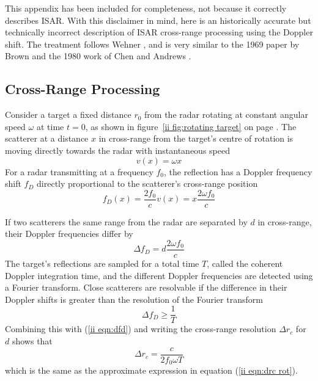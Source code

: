 This appendix has been included for completeness, not because it correctly
describes ISAR.  With this disclaimer in mind, here is an historically 
accurate but technically incorrect description of ISAR cross-range processing
using the Doppler shift.  The treatment follows Wehner \cite{Weh87}, and is
very similar to the 1969 paper by Brown \cite{Bro69} and the 1980 work of
Chen and Andrews \cite{Che80a}.

\subsection{Cross-Range Processing}

Consider a target a fixed distance $r_0$ from the radar rotating at constant
angular speed $\omega$ at time $t=0$, as shown in figure~\ref{ii fig:rotating target} 
on page \pageref{ii fig:rotating target}.  The scatterer at a distance $x$ in
cross-range from the target's centre of rotation is moving directly towards
the radar with instantaneous speed
\begin{equation}
v(x)=\omega x
\end{equation}
For a radar transmitting at a frequency $f_0$, the reflection has a Doppler
frequency shift $f_D$ directly proportional to the scatterer's cross-range
position
\begin{equation}
f_D(x)=\frac{2f_0}{c}v(x)=x\frac{2\omega f_0}{c}
\end{equation}

If two scatterers the same range from the radar are separated by $d$ in
cross-range, their Doppler frequencies differ by
\begin{equation}\label{ii eqn:dfd}
\Delta f_D=d\frac{2\omega f_0}{c}
\end{equation}
The target's reflections are sampled for a total time $T$, called the
coherent Doppler integration time, and the different Doppler frequencies are
detected using a Fourier transform.  Close scatterers are resolvable if the
difference in their Doppler shifts is greater than the resolution of the
Fourier transform
\begin{equation}
\Delta f_D\geq\frac{1}{T}
\end{equation}
Combining this with (\ref{ii eqn:dfd}) and writing the cross-range
resolution $\Delta r_c$ for $d$ shows that
\begin{equation}
\Delta r_c=\frac{c}{2f_0\omega T}
\end{equation}
which is the same as the approximate expression in equation 
(\ref{ii eqn:drc rot}).


